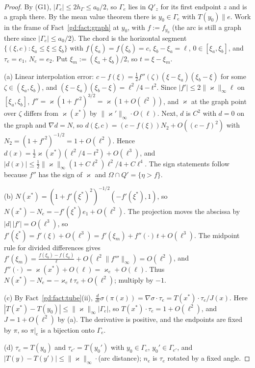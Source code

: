 \documentclass[11pt,reqno]{amsart}
\theoremstyle{plain}
\theoremstyle{definition}
\newcommand{\hG}{h_\Gamma}
\newcommand{\norm}[1]{\lVert #1\rVert}
\newcommand{\kap}{\varkappa}            %
\newcommand{\kapi}{\norm{\kap}_\infty}
\begin{document}
\begin{proof}
By (G1), $|\Gamma_e|\le2\hG\le a_0/2$, so $\Gamma_e$ lies in $Q'_{z}$ for its first endpoint $z$ and is a graph there. By the mean value theorem there is $y_0\in\Gamma_e$ with $T(y_0)\parallel e$. Work in the frame of Fact~\ref{gd:fact:graph} at $y_0$, with $f:=f_{y_0}$ (the arc is still a graph there since $|\Gamma_e|\le a_0/2$). The chord is the horizontal segment $\{(\xi,c):\xi_a\le\xi\le\xi_b\}$ with $f(\xi_a)=f(\xi_b)=c$, $\xi_b-\xi_a=\ell$, $0\in[\xi_a,\xi_b]$, and $\tau_e=e_1$, $N_e=e_2$. Put $\xi_m:=(\xi_a+\xi_b)/2$, so $t=\xi-\xi_m$.

(a) Linear interpolation error: $c-f(\xi)=\tfrac12f''(\zeta)(\xi-\xi_a)(\xi_b-\xi)$ for some $\zeta\in(\xi_a,\xi_b)$, and $(\xi-\xi_a)(\xi_b-\xi)=\ell^2/4-t^2$. Since $|f'|\le2\kapi\ell$ on $[\xi_a,\xi_b]$, $f''=\kap(1+f'^2)^{3/2}=\kap(1+O(\ell^2))$, and $\kap$ at the graph point over $\zeta$ differs from $\kap(x^\ast)$ by $\norm{\kap'}_\infty\cdot O(\ell)$. Next, $d$ is $C^2$ with $d=0$ on the graph and $\nabla d=N$, so $d(\xi,c)=(c-f(\xi))N_2+O((c-f)^2)$ with $N_2=(1+f'^2)^{-1/2}=1+O(\ell^2)$. Hence $d(x)=\frac12\kap(x^\ast)(\ell^2/4-t^2)+O(\ell^3)$, and $|d(x)|\le\frac12\kapi(1+C\ell^2)\ell^2/4+C\ell^4$. The sign statements follow because $f''$ has the sign of $\kap$ and $\Omega\cap Q'=\{\eta>f\}$.

(b) $N(x^\ast)=(1+f'(\xi^\ast)^2)^{-1/2}(-f'(\xi^\ast),1)$, so $N(x^\ast)-N_e=-f'(\xi^\ast)e_1+O(\ell^2)$. The projection moves the abscissa by $|d|\,|f'|=O(\ell^3)$, so $f'(\xi^\ast)=f'(\xi)+O(\ell^3)=f'(\xi_m)+f''(\cdot)\,t+O(\ell^3)$. The midpoint rule for divided differences gives $f'(\xi_m)=\frac{f(\xi_b)-f(\xi_a)}{\ell}+O(\ell^2\norm{f'''}_\infty)=O(\ell^2)$, and $f''(\cdot)=\kap(x^\ast)+O(\ell)=\kap_e+O(\ell)$. Thus $N(x^\ast)-N_e=-\kap_e t\,\tau_e+O(\ell^2)$; multiply by $-1$.

(c) By Fact~\ref{gd:fact:tube}(ii), $\frac{d}{dt}\sigma(\pi(x))=\nabla\sigma\cdot\tau_e=T(x^\ast)\cdot\tau_e/J(x)$. Here $|T(x^\ast)-T(y_0)|\le\kapi|\Gamma_e|$, so $T(x^\ast)\cdot\tau_e=1+O(\ell^2)$, and $J=1+O(\ell^2)$ by (a). The derivative is positive, and the endpoints are fixed by $\pi$, so $\pi|_e$ is a bijection onto $\Gamma_e$.

(d) $\tau_e=T(y_0)$ and $\tau_{e'}=T(y_0')$ with $y_0\in\Gamma_e$, $y_0'\in\Gamma_{e'}$, and $|T(y)-T(y')|\le\kapi\cdot$(arc distance); $n_e$ is $\tau_e$ rotated by a fixed angle.
\end{proof}
\end{document}
